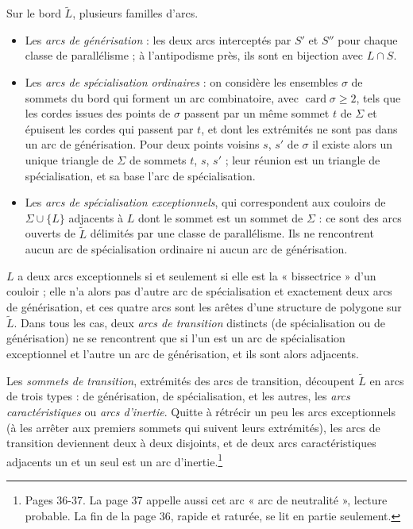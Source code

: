 \documentclass[11pt,a4paper]{article}
\begin{document}
Sur le bord $\widetilde{L}$, plusieurs familles d'arcs.
\begin{itemize}
\item Les \emph{arcs de générisation} : les deux arcs interceptés par $S'$ et
$S''$ pour chaque classe de parallélisme ; à l'antipodisme près, ils sont en
bijection avec $L \cap S$.
\item Les \emph{arcs de spécialisation ordinaires} : on considère les ensembles
$\sigma$ de sommets du bord qui forment un arc combinatoire, avec
$\operatorname{card}\sigma \geqslant 2$, tels que les cordes issues des points
de $\sigma$ passent par un même sommet $t$ de $\Sigma$ et épuisent les cordes
qui passent par $t$, et dont les extrémités ne sont pas dans un arc de
générisation. Pour deux points voisins $s$, $s'$ de $\sigma$ il existe alors un
unique triangle de $\Sigma$ de sommets $t$, $s$, $s'$ ; leur réunion est un
triangle de spécialisation, et sa base l'arc de spécialisation.
\item Les \emph{arcs de spécialisation exceptionnels}, qui correspondent aux
couloirs de $\Sigma \cup \lbrace L \rbrace$ adjacents à $L$ dont le sommet est
un sommet de $\Sigma$ : ce sont des arcs ouverts de $\widetilde{L}$ délimités par
une classe de parallélisme. Ils ne rencontrent aucun arc de spécialisation
ordinaire ni aucun arc de générisation.
\end{itemize}
$L$ a deux arcs exceptionnels si et seulement si elle est la « bissectrice »
d'un couloir ; elle n'a alors pas d'autre arc de spécialisation et exactement
deux arcs de générisation, et ces quatre arcs sont les arêtes d'une structure de
polygone sur $\widetilde{L}$. Dans tous les cas, deux \emph{arcs de transition}
distincts (de spécialisation ou de générisation) ne se rencontrent que si l'un
est un arc de spécialisation exceptionnel et l'autre un arc de générisation, et
ils sont alors adjacents.

Les \emph{sommets de transition}, extrémités des arcs de transition, découpent
$\widetilde{L}$ en arcs de trois types : de générisation, de spécialisation, et
les autres, les \emph{arcs caractéristiques} ou \emph{arcs d'inertie}.
Quitte à rétrécir un peu les arcs exceptionnels (à les arrêter aux premiers
sommets qui suivent leurs extrémités), les arcs de transition deviennent deux à
deux disjoints, et de deux arcs caractéristiques adjacents un et un seul est un
arc d'inertie.\footnote{Pages 36-37. La page 37 appelle aussi cet arc « arc de
neutralité », lecture probable. La fin de la page 36, rapide et raturée, se lit
en partie seulement.}
\end{document}
